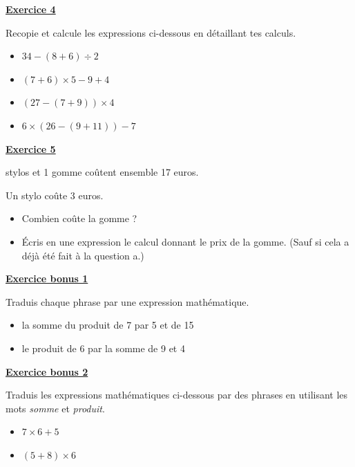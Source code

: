 \documentclass[13pt]{extarticle}
\newcommand{\exo}[1]{%
  \vspace{0.8em}%
  \noindent\large\underline{\textbf{Exercice #1}}%
  \vspace{0.2em}\par%
}
\newcommand{\exobonus}[1]{%
  \vspace{0.8em}%
  \noindent\large\underline{\textbf{Exercice bonus #1}}%
  \vspace{0.2em}\par%
}
\begin{document}
\exo{4}

\noindent Recopie et calcule les expressions ci-dessous en détaillant tes calculs.

\begin{itemize}
  \item[a)] $34 - (8 + 6) \div 2$
  \item[b)] $(7 + 6) \times 5 - 9 + 4$
  \item[c)] $(27 - (7 + 9)) \times 4$
  \item[d)] $6 \times (26 - (9 + 11)) - 7$
\end{itemize}

\newpage

\exo{5}

 stylos et 1 gomme coûtent ensemble 17 euros.

\noindent Un stylo coûte 3 euros.

\begin{itemize}
  \item[a)] Combien coûte la gomme ?
  \item[b)] Écris en une expression le calcul donnant le prix de la gomme. (Sauf si cela a déjà été fait à la question a.)
\end{itemize}

\exobonus{1}

\noindent Traduis chaque phrase par une expression mathématique.

\begin{itemize}
  \item[a)] la somme du produit de 7 par 5 et de 15
  \item[b)] le produit de 6 par la somme de 9 et 4
\end{itemize}

\exobonus{2}

\noindent Traduis les expressions mathématiques ci-dessous par des phrases en utilisant les mots \emph{somme} et \emph{produit}.

\begin{itemize}
  \item[a)] $7 \times 6 + 5$
  \item[b)] $(5 + 8) \times 6$
\end{itemize}

\newpage
\end{document}
